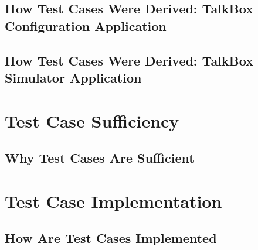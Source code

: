 \section{How Test Cases Were Derived: TalkBox Configuration Application}
\section{How Test Cases Were Derived: TalkBox Simulator Application}

\chapter{Test Case Sufficiency}
\label{Other Nonfunctional Requirements}

\section{Why Test Cases Are Sufficient}


\chapter{Test Case Implementation}
\label{Other Requirements}
\section{How Are Test Cases Implemented}



